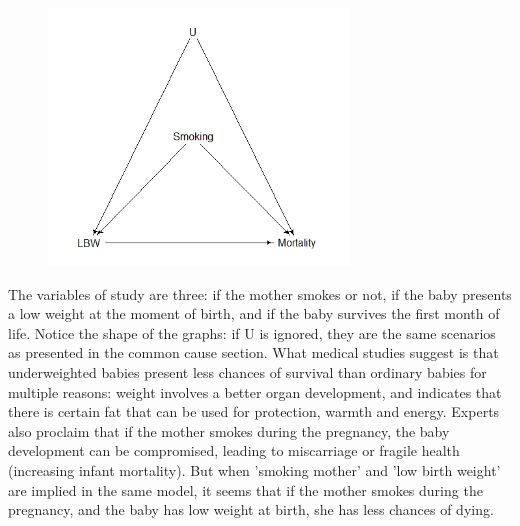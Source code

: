 \documentclass{article}
\begin{document}
\begin{figure}[h]
\includegraphics[width=8cm]{LBW2DAG.png}
\centering
\end{figure}
\newpage
The variables of study are three: if the mother smokes or not, if the baby presents a low weight at the moment of birth, and if the baby survives the first month of life. Notice the shape of the graphs: if U is ignored, they are the same scenarios as presented in the common cause section. What medical studies suggest is that underweighted babies present less chances of survival than ordinary babies for multiple reasons: weight involves a better organ development, and indicates that there is certain fat that can be used for protection, warmth and energy. Experts also proclaim that if the mother smokes during the pregnancy, the baby development can be compromised, leading to miscarriage or fragile health (increasing infant mortality). But when 'smoking mother' and 'low birth weight' are implied in the same model, it seems that if the mother smokes during the pregnancy, and the baby has low weight at birth, she has less chances of dying. 
\end{document}
